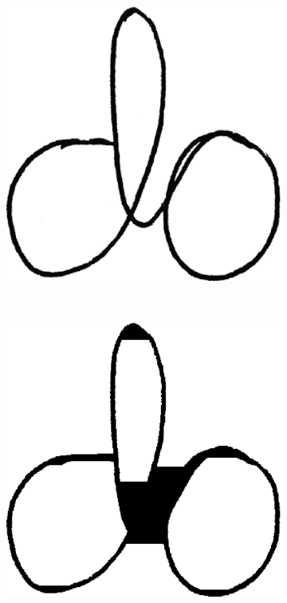 \begin{figure}
\centering
\begin{subfigure}[b]{0.25\textwidth}
\centering
\includegraphics[width=\textwidth]{images/do.eps}
\caption{}\label{fig:pasos_mala_seg_original}
\end{subfigure}
~
\begin{subfigure}[b]{0.25\textwidth}
\centering
\includegraphics[width=\textwidth]{images/do_RLSA.eps}

\end{subfigure}
\end{figure}
